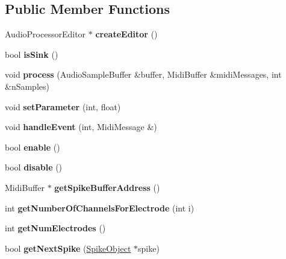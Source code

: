 \subsection*{Public Member Functions}
\begin{DoxyCompactItemize}
\item 
\hypertarget{classSpikeDisplayNode_a313aadc4cf4cde9bd4ef08c9119b9cf9}{Audio\-Processor\-Editor $\ast$ {\bfseries create\-Editor} ()}\label{classSpikeDisplayNode_a313aadc4cf4cde9bd4ef08c9119b9cf9}

\item 
\hypertarget{classSpikeDisplayNode_a2daedb6bd54b65b5b3bbf1b507d7d568}{bool {\bfseries is\-Sink} ()}\label{classSpikeDisplayNode_a2daedb6bd54b65b5b3bbf1b507d7d568}

\item 
\hypertarget{classSpikeDisplayNode_a5c6d9afd49e85f383ec5631d232dca76}{void {\bfseries process} (Audio\-Sample\-Buffer \&buffer, Midi\-Buffer \&midi\-Messages, int \&n\-Samples)}\label{classSpikeDisplayNode_a5c6d9afd49e85f383ec5631d232dca76}

\item 
\hypertarget{classSpikeDisplayNode_a000a21d39870567e6b95f0676fcd2d51}{void {\bfseries set\-Parameter} (int, float)}\label{classSpikeDisplayNode_a000a21d39870567e6b95f0676fcd2d51}

\item 
\hypertarget{classSpikeDisplayNode_a5aeb76922e1f99d873ddf9d0b39b261e}{void {\bfseries handle\-Event} (int, Midi\-Message \&)}\label{classSpikeDisplayNode_a5aeb76922e1f99d873ddf9d0b39b261e}

\item 
\hypertarget{classSpikeDisplayNode_a27467b2a989ce2e83153d578a5567dd7}{bool {\bfseries enable} ()}\label{classSpikeDisplayNode_a27467b2a989ce2e83153d578a5567dd7}

\item 
\hypertarget{classSpikeDisplayNode_a7d360430be47c72f14a8a776b945dd1a}{bool {\bfseries disable} ()}\label{classSpikeDisplayNode_a7d360430be47c72f14a8a776b945dd1a}

\item 
\hypertarget{classSpikeDisplayNode_a1090bac27990b984f670c8935c17cc97}{Midi\-Buffer $\ast$ {\bfseries get\-Spike\-Buffer\-Address} ()}\label{classSpikeDisplayNode_a1090bac27990b984f670c8935c17cc97}

\item 
\hypertarget{classSpikeDisplayNode_a85908f865f1692bacf36df869170616c}{int {\bfseries get\-Number\-Of\-Channels\-For\-Electrode} (int i)}\label{classSpikeDisplayNode_a85908f865f1692bacf36df869170616c}

\item 
\hypertarget{classSpikeDisplayNode_a51acdbe4570fd6f65dd361f2ba7cff26}{int {\bfseries get\-Num\-Electrodes} ()}\label{classSpikeDisplayNode_a51acdbe4570fd6f65dd361f2ba7cff26}

\item 
\hypertarget{classSpikeDisplayNode_a53dc19ffc860d58dc5bc7ac1f030909d}{bool {\bfseries get\-Next\-Spike} (\hyperlink{structSpikeObject}{Spike\-Object} $\ast$spike)}\label{classSpikeDisplayNode_a53dc19ffc860d58dc5bc7ac1f030909d}

\end{DoxyCompactItemize}
